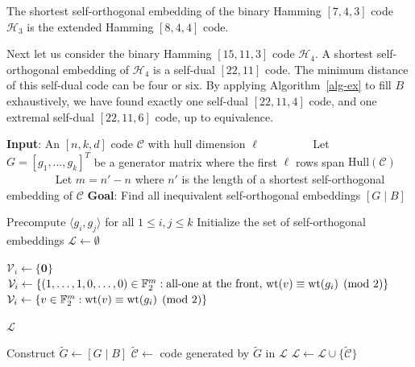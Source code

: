 \documentclass{article}
\theoremstyle{definition}
\theoremstyle{remark}
\begin{document}
The shortest self-orthogonal embedding of the binary Hamming $[7, 4, 3]$ code $\mathcal H_3$ is the extended Hamming $[8, 4, 4]$ code.

Next let us consider the binary Hamming $[15, 11, 3]$ code $\mathcal H_4$. A shortest self-orthogonal embedding of $\mathcal H_4$ is a self-dual $[22, 11]$ code. The minimum distance of this self-dual code can be four or six. By applying Algorithm~\ref{alg-ex} to fill $B$ exhaustively, we have found exactly one self-dual $[22, 11, 4]$ code, and one extremal self-dual $[22, 11, 6]$ code, up to equivalence.


\begin{algorithm}[!htb]
  \caption{Exhaustive search for self-orthogonal embeddings of a linear code}
  \label{alg-ex}
  \begin{algorithmic}[1]
      \State \textbf{Input}: An $[n,k,d]$ code $\mathcal{C}$ with hull dimension $\ell$
      \State ~~~~~~~~ Let $G = [g_1, \ldots, g_k]^T$ be a generator matrix where the first $\ell$ rows span $\text{Hull}(\mathcal{C})$ 
      \State ~~~~~~~~ Let $m=n'-n$ where $n'$ is the length of a shortest self-orthogonal embedding of $\mathcal{C}$
      \State \textbf{Goal}: Find all inequivalent self-orthogonal embeddings $[G \mid B]$

          \State Precompute $\langle g_i, g_j \rangle$ for all $1 \le i,j \le k$
          \State Initialize the set of self-orthogonal embeddings $\mathcal{L} \gets \emptyset$

                  \State $\mathcal{V}_i \gets \{\mathbf{0}\}$
                  \State $\mathcal{V}_i \gets \{(1,\ldots,1,0,\ldots,0) \in \mathbb{F}_2^m : \text{all-one at the front, } {\rm wt}(v) \equiv {\rm wt}(g_i) \pmod{2}\}$
              \Else
                  \State $\mathcal{V}_i \gets \{v \in \mathbb{F}_2^m : {\rm wt}(v) \equiv {\rm wt}(g_i) \pmod{2}\}$
              \EndIf
          \EndFor

          \State {}
          \State \Return $\mathcal{L}$

                  \State Construct $\tilde{G} \gets [G \mid B]$
                      \State $\tilde{\mathcal{C}} \gets$ code generated by $\tilde{G}$
                       in $\mathcal{L}$
                          \State $\mathcal{L} \gets \mathcal{L} \cup \{\tilde{\mathcal{C}}\}$
                      \EndIf
                  \EndIf
                  \State \Return
              \EndIf

                      \State {}
                  \EndIf
              \EndFor
          \EndProcedure
      \EndProcedure
  \end{algorithmic}
\end{algorithm}
\end{document}
